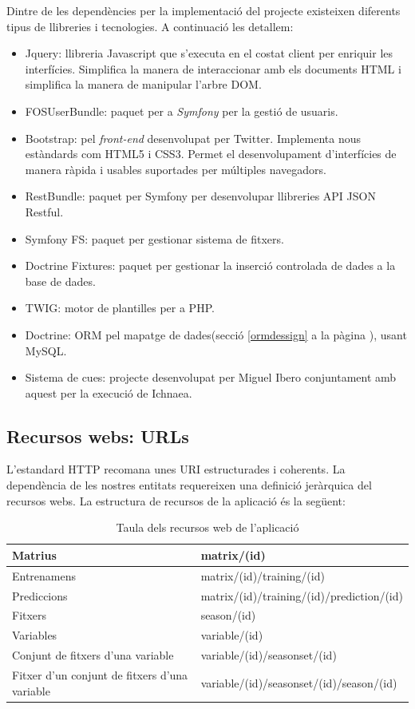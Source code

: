 Dintre de les dependències per la implementació del projecte existeixen diferents tipus de llibreries i tecnologies. A continuació les detallem:
\begin{itemize}
\item Jquery: llibreria Javascript que s'executa en el costat client per enriquir les interfícies.\cite{jquery} Simplifica la manera de interaccionar amb els documents HTML\cite{html} i simplifica la manera de manipular l'arbre DOM.\cite{dom}
\item FOSUserBundle: paquet per a \textit{Symfony} per la gesti\'{o} de usuaris.\cite{fosuserbundle}
\item Bootstrap:  pel \textit{front-end} desenvolupat per Twitter. Implementa nous estàndards com HTML5\cite{html5} i CSS3\cite{css3}. Permet el desenvolupament d'interf\'{i}cies de manera r\`{a}pida i usables suportades per múltiples navegadors.
\item RestBundle: paquet per Symfony per desenvolupar llibreries API JSON Restful.\cite{apijson}
\item Symfony FS: paquet per gestionar sistema de fitxers.
\item Doctrine Fixtures: paquet per gestionar la inserci\'{o} controlada de dades a la base de dades.
\item TWIG: motor de plantilles per a PHP.\cite{twig}
\item Doctrine: ORM pel mapatge de dades(secció \ref{ormdessign} a la p\`{a}gina \pageref{ormdessign}), usant MySQL.\cite{mysql}
\item Sistema de cues: projecte desenvolupat per Miguel Ibero conjuntament amb aquest per la execució de Ichnaea.
\end{itemize}

\subsection{Recursos webs: URLs}
L'estandard HTTP recomana unes URI estructurades i coherents.\cite{rfc3986} La dependència de les nostres entitats requereixen una definició jeràrquica del recursos webs. La estructura de recursos de la aplicaci\'{o} \'{e}s la següent:\\

\begin{table}[ht]
\begin{tabular}{| p{5cm} | p{10cm} |}
\hline
Matrius     & matrix/(id) \\ \hline
Entrenamens & matrix/(id)/training/(id) \\ \hline
Prediccions & matrix/(id)/training/(id)/prediction/(id) \\ \hline
Fitxers 	& season/(id) \\ \hline
Variables	& variable/(id) \\ \hline
Conjunt de fitxers d'una variable & variable/(id)/seasonset/(id) \\ \hline
Fitxer d'un conjunt de fitxers d'una variable & variable/(id)/seasonset/(id)/season/(id) \\ \hline
\end{tabular}
\caption{Taula dels recursos web de l'aplicació}
\end{table}
\\

